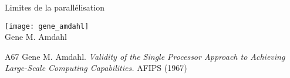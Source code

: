 
\begingroup

\begin{frame}{Limites de la parallélisation}
  \vFill
  \begin{center}
      \texttt{[image: gene\_amdahl]}\\
      Gene M. Amdahl
    \end{center}
  \vFill
  \begin{citing}
  \item[A67] Gene M. Amdahl. \textit{Validity of the Single Processor Approach to Achieving Large-Scale Computing Capabilities.} AFIPS (1967)
  \end{citing}
\end{frame}



\endgroup
\endinput
